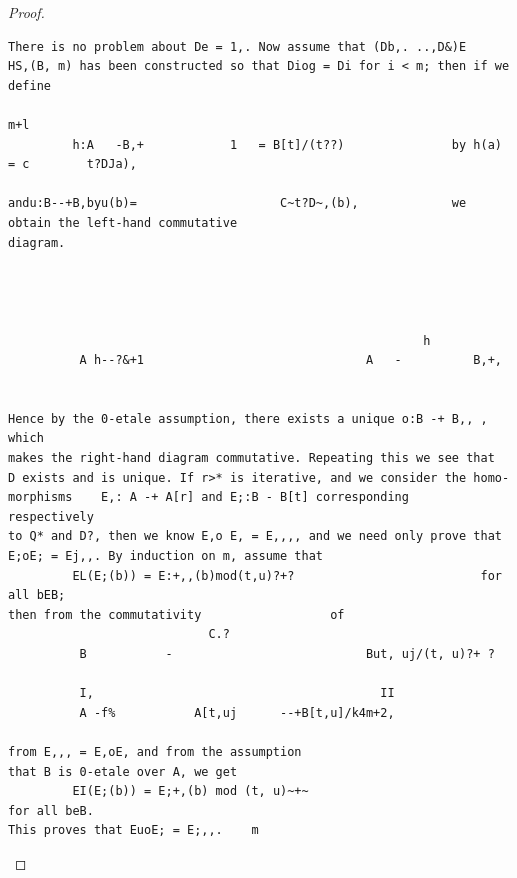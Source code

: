 \begin{proof}
\begin{verbatim}
There is no problem about De = 1,. Now assume that (Db,. ..,D&)E
HS,(B, m) has been constructed so that Diog = Di for i < m; then if we define
                                                                           m+l
         h:A   -B,+            1   = B[t]/(t??)               by h(a) = c        t?DJa),

andu:B--+B,byu(b)=                    C~t?D~,(b),             we obtain the left-hand commutative
diagram.




                                                          h
          A h--?&+1                               A   -          B,+,


Hence by the 0-etale assumption, there exists a unique o:B -+ B,, , which
makes the right-hand diagram commutative. Repeating this we see that
D exists and is unique. If r>* is iterative, and we consider the homo-
morphisms    E,: A -+ A[r] and E;:B - B[t] corresponding      respectively
to Q* and D?, then we know E,o E, = E,,,, and we need only prove that
E;oE; = Ej,,. By induction on m, assume that
         EL(E;(b)) = E:+,,(b)mod(t,u)?+?                          for all bEB;
then from the commutativity                  of
                            C.?
          B           -                           But, uj/(t, u)?+ ?

          I,                                        II
          A -f%           A[t,uj      --+B[t,u]/k4m+2,

from E,,, = E,oE, and from the assumption                                that B is 0-etale over A, we get
         EI(E;(b)) = E;+,(b) mod (t, u)~+~                              for all beB.
This proves that EuoE; = E;,,.    m
\end{verbatim}
\end{proof}


